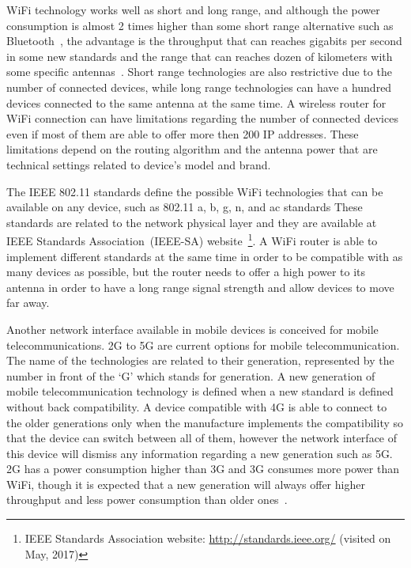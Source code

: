 WiFi technology works well as short and long range, and although the power consumption is almost 2 times higher than some short range alternative such as Bluetooth~\citep{Friedman2013wifibluetooth}, the advantage is the throughput that can reaches gigabits per second in some new standards and the range that can reaches dozen of kilometers with some specific antennas~\citep{Raman2007Experienceswifiindia}.
Short range technologies are also restrictive due to the number of connected devices, while long range technologies can have a hundred devices connected to the same antenna at the same time.
A wireless router for WiFi connection can have limitations regarding the number of connected devices even if most of them are able to offer more then 200 IP addresses.
These limitations depend on the routing algorithm and the antenna power that are technical settings related to device's model and brand.

The IEEE 802.11 standards define the possible WiFi technologies that can be available on any device, such as 802.11 a, b, g, n, and ac standards
These standards are related to the network physical layer and they are available at IEEE Standards Association~(IEEE-SA) website~\footnote{IEEE Standards Association website: \url{http://standards.ieee.org/} (visited on May, 2017)}.
A WiFi router is able to implement different standards at the same time in order to be compatible with as many devices as possible, but the router needs to offer a high power to its antenna in order to have a long range signal strength and allow devices to move far away.

Another network interface available in mobile devices is conceived for mobile telecommunications.
2G to 5G are current options for mobile telecommunication.
The name of the technologies are related to their generation, represented by the number in front of the `G' which stands for generation.
A new generation of mobile telecommunication technology is defined when a new standard is defined without back compatibility.
A device compatible with 4G is able to connect to the older generations only when the manufacture implements the compatibility so that the device can switch between all of them, however the network interface of this device will dismiss any information regarding a new generation such as 5G.
2G has a power consumption higher than 3G and 3G consumes more power than WiFi, though it is expected that a new generation will always offer higher throughput and less power consumption than older ones~\citep{Rice2010decomposing,Balasubramanian2009energy}.

